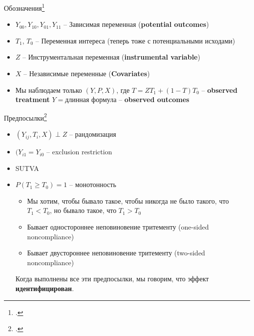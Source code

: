 \begin{frame}{Обозначения\footcitetext[Глава 4.4]{angrist2008mostly}} 
\begin{itemize}
    \item $Y_{00}, Y_{10}, Y_{01}, Y_{11}$ -- Зависимая переменная (\textbf{potential outcomes})
    \item $T_1$, $T_0$ -- Переменная интереса (теперь тоже с потенциальными исходами)
    \item $Z$ -- Инструментальная переменная (\textbf{instrumental variable})
    \item $X$ -- Независимые переменные (\textbf{Covariates})
    \item Мы наблюдаем только $(Y, P, X)$, где $T = ZT_1 + (1-T)T_0$ -- \textbf{observed treatment} $Y = \texttt{длинная формула}$ -- \textbf{observed outcomes}
\end{itemize}
\end{frame}

\begin{frame}{Предпосылки\footcitetext[Часть VI]{imbens2015causal}}

\begin{itemize}
    \item $(Y_{ij}, T_i, X) \perp Z$ -- рандомизация
    \item $(Y_{i1} = Y_{i0}$ -- exclusion restriction
    \item SUTVA
    \item<2-> $P(T_1 \geq T_0) = 1$ -- монотонность %
    \begin{itemize}
        \item Мы хотим, чтобы бывало такое, чтобы никогда не было такого, что  $T_1 < T_0$, но бывало такое, что $T_1 > T_0$
        \item Бывает одностороннее неповиновение тритементу (one-sided noncompliance)
        \item Бывает двустороннее неповиновение тритементу (two-sided noncompliance)
    \end{itemize}

Когда выполнены все эти предпосылки, мы говорим, что эффект \textbf{идентифицирован}.
\end{itemize}
\end{frame}


